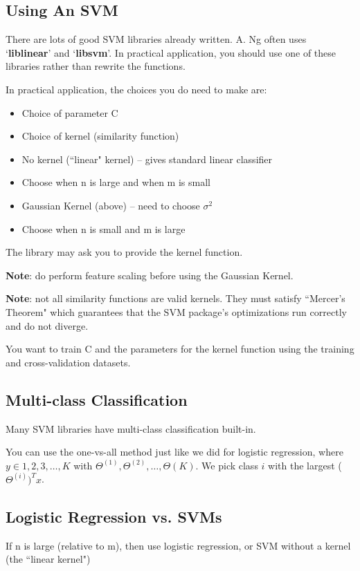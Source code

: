 \subsection{Using An SVM}

There are lots of good SVM libraries already written. A. Ng often uses `\textbf{liblinear}' and `\textbf{libsvm}'. In practical application, you should use one of these libraries rather than rewrite the functions.

In practical application, the choices you do need to make are:
\begin{itemize}
	\item Choice of parameter C
	\item Choice of kernel (similarity function)
	\item No kernel (``linear" kernel) -- gives standard linear classifier
	\item Choose when n is large and when m is small
	\item Gaussian Kernel (above) -- need to choose $\sigma^2$ 
	\item Choose when n is small and m is large
\end{itemize}

The library may ask you to provide the kernel function.

\textbf{Note}: do perform feature scaling before using the Gaussian Kernel.

\textbf{Note}: not all similarity functions are valid kernels. They must satisfy ``Mercer's Theorem" which guarantees that the SVM package's optimizations run correctly and do not diverge.

You want to train C and the parameters for the kernel function using the training and cross-validation datasets.

\subsection{Multi-class Classification}
Many SVM libraries have multi-class classification built-in.

You can use the one-vs-all method just like we did for logistic regression, where $y \in {1,2,3,\dots,K}$ with $\Theta^{(1)}, \Theta^{(2)}, \dots,\Theta{(K)}$. We pick class $i$ with the largest ($\Theta^{(i)})^Tx$.

\subsection{Logistic Regression vs. SVMs}
If n is large (relative to m), then use logistic regression, or SVM without a kernel (the ``linear kernel")


